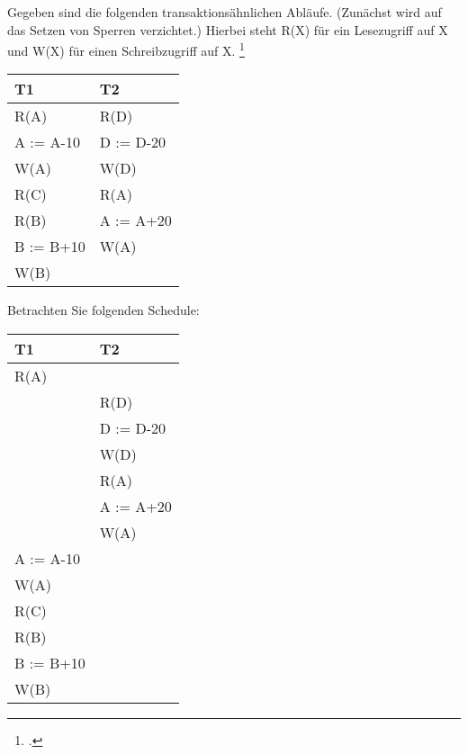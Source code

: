 \documentclass{lehramt-informatik-aufgabe}
\begin{document}

Gegeben sind die folgenden transaktionsähnlichen Abläufe. (Zunächst wird
auf das Setzen von Sperren verzichtet.) Hierbei steht R(X) für ein
Lesezugriff auf X und W(X) für einen Schreibzugriff auf X.
\footcite{examen:66116:2021:03}

\begin{center}
\begin{tabular}{|l|l|}
\hline
T1 & T2 \\\hline
R(A) & R(D) \\
A := A-10 & D := D-20 \\
W(A) & W(D) \\
R(C)   & R(A) \\
R(B) & A := A+20 \\
B := B+10 & W(A) \\
W(B)      &
\\\hline
\end{tabular}
\end{center}

\noindent
Betrachten Sie folgenden Schedule:

\begin{center}
\begin{tabular}{|l|l|}
\hline
T1 & T2 \\\hline

R(A) & \\

& R(D) \\
& D := D-20 \\
& W(D) \\
& R(A) \\
& A := A+20 \\
& W(A) \\

A := A-10 & \\
W(A) & \\
R(C) & \\
R(B) & \\
B := B+10 & \\
W(B) & \\\hline
\end{tabular}
\end{center}
\end{document}
